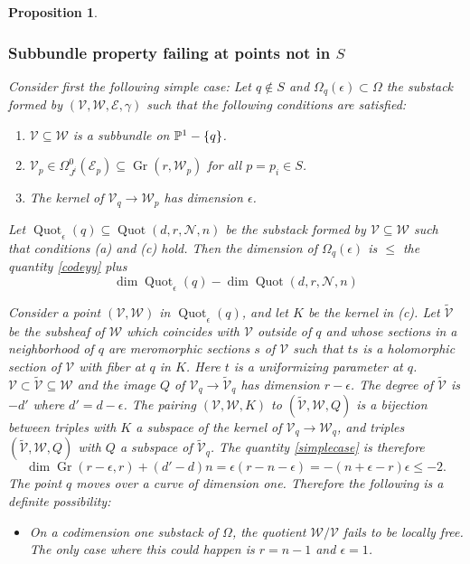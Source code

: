 \documentclass[11pt]{amsart}
\newcommand\me{\mathcal{E}}
\newcommand\mv{\mathcal{V}}
\newcommand\mw{\mathcal{W}}
\newcommand\mn{\mathcal{N}}
\newcommand\Gr{\operatorname{Gr}}
\newcommand\Quot{\operatorname{Quot}}
\newtheorem{proposition}[theorem]{Proposition}
\numberwithin{theorem}{subsection}
\begin{document}
{\begin{proposition}
\subsubsection{Subbundle property failing at points not in $S$}\label{bruck01}
Consider first the following simple case: Let $q\not\in S$ and $\Omega_q(\epsilon)\subset \Omega$ the substack formed by
$(\mv,\mw,\me,\gamma)$ such that the following conditions are satisfied:
\begin{enumerate}
\item[(a)] $\mv\subseteq \mw$ is a subbundle on $\Bbb{P}^1-\{q\}$.

\item[(b)]   $\mv_p\in \Omega^0_{J^i}(\me_p)\subseteq \Gr(r,\mw_p)$ for all $p=p_i\in S$.
\item[(c)] The kernel of $\mv_q\to\mw_p$ has  dimension $\epsilon$.
\end{enumerate}
Let $\Quot_{\epsilon}(q)\subseteq  \Quot(d,r,\mn,n) $ be the substack formed by $\mv\subseteq \mw$ such that conditions (a) and (c) hold. Then the dimension of  $\Omega_q(\epsilon)$ is $\leq$ the quantity \eqref{codeyy} plus
\begin{equation}\label{simplecase}
\dim \Quot_{\epsilon}(q)-\dim  \Quot(d,r,\mn,n)
\end{equation}

Consider a point $(\mv,\mw)$ in  $\Quot_{\epsilon}(q)$, and let $K$ be the kernel in (c). Let $\widetilde{\mv}$ be the subsheaf of $\mw$ which coincides with $\mv$ outside of $q$ and whose sections in a neighborhood of $q$ are meromorphic sections $s$ of $\mv$ such that $ts$ is a holomorphic section of $\mv$ with fiber at $q$ in $K$. Here $t$ is a uniformizing parameter at $q$. $\mv\subset\widetilde{\mv}\subseteq\mw$ and the image  $Q$ of $\mv_q\to \widetilde{\mv}_q$ has dimension $r-\epsilon$. The degree of $\widetilde{\mv}$ is $-d'$ where $d'=d-\epsilon$. The pairing $(\mv,\mw,K)$ to $(\widetilde{\mv},\mw,Q)$ is a bijection between triples with $K$ a subspace of the kernel of $\mv_q\to \mw_q$, and triples $(\widetilde{\mv},\mw,Q)$ with $Q$ a subspace of $\widetilde{\mv}_q$. The quantity
\eqref{simplecase} is therefore
$$\dim \Gr(r-\epsilon,r)+ (d'-d)n=\epsilon (r-n-\epsilon) =-(n+\epsilon-r)\epsilon\leq -2.$$
The point $q$ moves over a curve of dimension one. Therefore the following is a definite possibility:
\begin{itemize}
\item On a codimension one substack of $\Omega$, the quotient $\mw/\mv$ fails to be locally free. The only case where  this could happen is
$r=n-1$ and $\epsilon=1$.
\end{itemize}

\end{proposition}}
\end{document}
